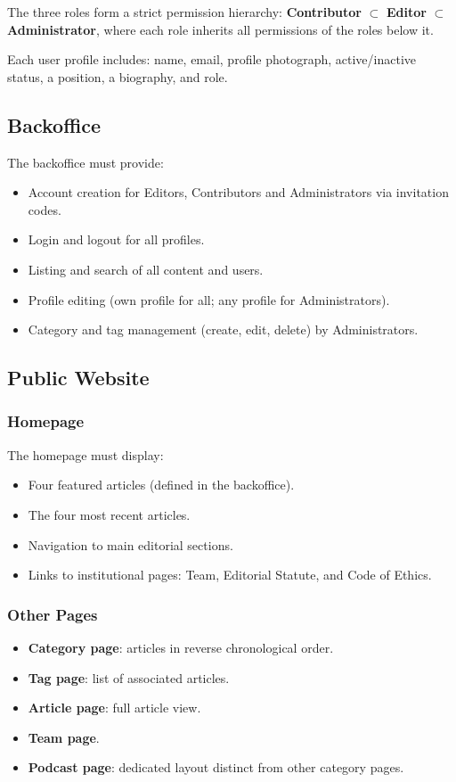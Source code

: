 The three roles form a strict permission hierarchy:
\textbf{Contributor} $\subset$ \textbf{Editor} $\subset$ \textbf{Administrator},
where each role inherits all permissions of the roles below it.

Each user profile includes: name, email, profile photograph, active/inactive status, a position, a biography, and role.

\subsection{Backoffice} \label{sec:req_backoffice}

The backoffice must provide:

\begin{itemize}
      \item Account creation for Editors, Contributors and Administrators via invitation codes.
      \item Login and logout for all profiles.
      \item Listing and search of all content and users.
      \item Profile editing (own profile for all; any profile for Administrators).
      \item Category and tag management (create, edit, delete) by Administrators.
\end{itemize}

\subsection{Public Website} \label{sec:req_frontend}

\subsubsection{Homepage}
The homepage must display:
\begin{itemize}
      \item Four featured articles (defined in the backoffice).
      \item The four most recent articles.
      \item Navigation to main editorial sections.
      \item Links to institutional pages: Team, Editorial Statute, and Code of Ethics.
\end{itemize}

\subsubsection{Other Pages}
\begin{itemize}
      \item \textbf{Category page}: articles in reverse chronological order.
      \item \textbf{Tag page}: list of associated articles.
      \item \textbf{Article page}: full article view.
      \item \textbf{Team page}.
      \item \textbf{Podcast page}: dedicated layout distinct from other category pages.
\end{itemize}

